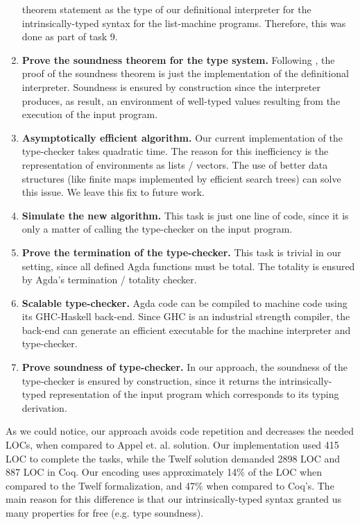 \documentclass[review]{elsarticle}
\theoremstyle{definition}
\begin{document}
\begin{enumerate}
        theorem statement as the type of our definitional interpreter for the intrinsically-typed syntax for the list-machine
        programs. Therefore, this was done as part of task 9.
  \item \textbf{Prove the soundness theorem for the type system.} Following \cite{Amin17}, the proof of the soundness
        theorem is just the implementation of the definitional interpreter. Soundness is ensured by construction since the interpreter
        produces, as result, an environment of well-typed values resulting from the execution of the input program.
  \item \textbf{Asymptotically efficient algorithm.} Our current implementation of the type-checker takes quadratic time. The reason
        for this inefficiency is the representation of environments as lists / vectors. The use of better data structures (like finite
        maps implemented by efficient search trees) can solve this issue. We leave this fix to future work.
  \item \textbf{Simulate the new algorithm.} This task is just one line of code, since it is only a matter of calling the type-checker
        on the input program.
  \item \textbf{Prove the termination of the type-checker.} This task is trivial in our setting, since all defined Agda functions
        must be total. The totality is ensured by Agda's termination / totality checker.
  \item \textbf{Scalable type-checker.} Agda code can be compiled to machine code using its GHC-Haskell back-end. Since GHC is
        an industrial strength compiler, the back-end can generate an efficient executable for the machine interpreter and type-checker.
  \item \textbf{Prove soundness of type-checker.} In our approach, the soundness of the type-checker is ensured by construction,
        since it returns the intrinsically-typed representation of the input program which corresponds to its typing derivation.
\end{enumerate}

As we could notice, our approach avoids code repetition and decreases the needed LOCs, when compared to Appel et. al.
\cite{Appel07} solution.
Our implementation used 415 LOC to complete the tasks, while the Twelf solution demanded 2898 LOC and 887 LOC in Coq.
Our encoding uses approximately 14\% of the LOC when compared to the Twelf formalization, and 47\% when compared to Coq's. The main
reason for this difference is that our intrinsically-typed syntax granted us many properties for free (e.g. type soundness).
\end{document}
